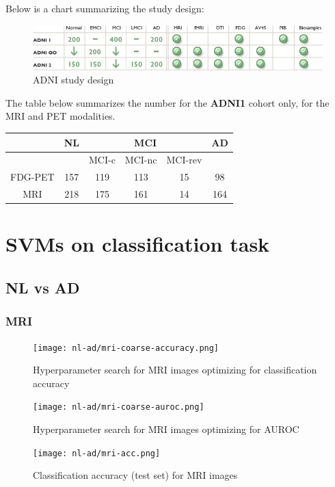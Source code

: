 \documentclass[12pt,a4paper]{article}
\begin{document}
Below is a chart summarizing the study design:

\begin{figure}[ht]
  \centering
  \includegraphics[width=\textwidth]{study-design.png}
  \caption{\label{fig:design}ADNI study design}
\end{figure}

The table below summarizes the number for the \textbf{ADNI1} cohort
only, for the MRI and PET modalities.

\begin{tabular}[H]{c | c | c | c | c | c}
  & NL & \multicolumn{3}{|c|}{MCI} & AD\\
\hline
& & MCI-c & MCI-nc & MCI-rev &\\
\hline
FDG-PET & 157 & 119 & 113 & 15 & 98\\
MRI & 218 & 175 & 161 & 14 & 164
\end{tabular}

\section{SVMs on classification task}
\label{sec:svm}

\subsection{NL vs AD}
\label{sec:nl-vs-ad}

\subsubsection{MRI}
\label{sec:mri}

\begin{figure}[H]
  \centering
  \texttt{[image: nl-ad/mri-coarse-accuracy.png]}
  \caption{\label{figaa:design}Hyperparameter search for MRI images
    optimizing for classification accuracy}
\end{figure}

\begin{figure}[H]
  \centering
  \texttt{[image: nl-ad/mri-coarse-auroc.png]}
  \caption{\label{fig:dbbesign}Hyperparameter search for MRI images
    optimizing for AUROC}
\end{figure}

\begin{figure}[H]
  \centering
  \texttt{[image: nl-ad/mri-acc.png]}
  \caption{\label{fig:desssign}Classification accuracy (test set) for MRI images}
\end{figure}
\end{document}
